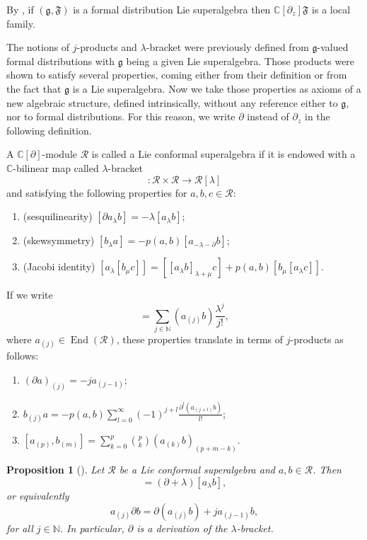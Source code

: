 \documentclass[a4paper, 12pt, reqno]{amsart}
\newtheorem{proposition}[theorem]{Proposition}
\theoremstyle{remark}
\numberwithin{equation}{subsection}
\DeclareMathOperator{\End}{End}
\begin{document}
By , if $(\mathfrak{g}, \mathfrak{F})$ is a formal distribution Lie superalgebra then $\mathbb{C}[\partial_z]\mathfrak{F}$ is a local family.

The notions of $j$-products and $\lambda$-bracket were previously defined from $\mathfrak{g}$-valued formal distributions with $\mathfrak{g}$ being a given Lie superalgebra.
Those products were shown to satisfy several properties, coming either from their definition or from the fact that $\mathfrak{g}$ is a Lie superalgebra.
Now we take those properties as axioms of a new algebraic structure, defined intrinsically, without any reference either to $\mathfrak{g}$, nor to formal distributions.
For this reason, we write $\partial$ instead of $\partial_z$ in the following definition.

A $\mathbb{C}[\partial]$-module $\mathcal{R}$ is called a Lie conformal superalgebra if it is endowed with a $\mathbb{C}$-bilinear map called $\lambda$-bracket
\begin{equation*}
  [\bullet_{\lambda}\bullet]: \mathcal{R}\times\mathcal{R} \to \mathcal{R}[\lambda]
\end{equation*}
and satisfying the following properties for $a, b, c \in \mathcal{R}$:
\begin{enumerate}
\item (sesquilinearity) $[\partial a_{\lambda}b] = -\lambda[a_{\lambda}b]$;
\item (skewsymmetry) $[b_{\lambda}a] = -p(a, b)[a_{-\lambda - \partial}b]$;
\item (Jacobi identity) $[a_{\lambda}[b_{\mu}c]] = [[a_{\lambda}b]_{\lambda +\mu}c] + p(a, b)[b_{\mu}[a_{\lambda}c]]$.
\end{enumerate}

If we write
\begin{equation*}
  [a_{\lambda}b] = \sum_{j \in \mathbb{N}}(a_{(j)}b)\frac{\lambda^j}{j!},
\end{equation*}
where $a_{(j)} \in \End(\mathcal{R})$, these properties translate in terms of $j$-products as follows:
\begin{enumerate}
\item $(\partial a)_{(j)} = -j a_{(j - 1)}$; 
\item $b_{(j)}a = -p(a,b)\sum_{l = 0}^\infty(-1)^{j + l}\frac{\partial^l(a_{(j + l)}b)}{l!}$;
\item $[a_{(p)},b_{(m)}] = \sum_{k = 0}^p\binom{p}{k}(a_{(k)}b)_{(p + m - k)}$.
\end{enumerate}

\begin{proposition}[{\cite[Remark 2.5.3]{nozaradan_introduction_2008}}]
  \label{prp:3}
  Let $\mathcal{R}$ be a Lie conformal superalgebra and $a, b \in \mathcal{R}$.
  Then
  \begin{equation*}
    [a_{\lambda}\partial b] = (\partial + \lambda)[a_{\lambda}b],
  \end{equation*}
  or equivalently
  \begin{equation*}
    a_{(j)}\partial b = \partial(a_{(j)}b) + ja_{(j - 1)}b,
  \end{equation*}
  for all $j \in \mathbb{N}$.
  In particular, $\partial$ is a derivation of the $\lambda$-bracket.
\end{proposition}
\end{document}
